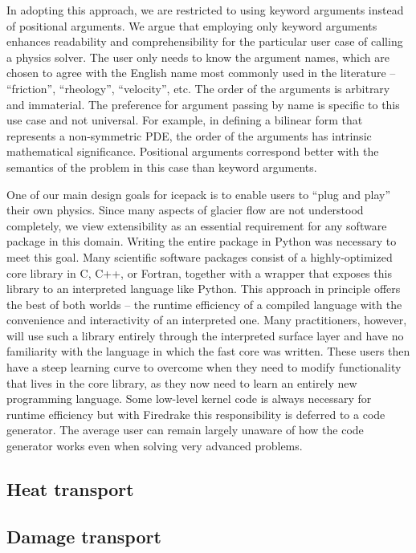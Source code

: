 \documentclass{article}
\theoremstyle{definition}
\theoremstyle{plain}
\begin{document}
In adopting this approach, we are restricted to using keyword arguments instead of positional arguments.
We argue that employing only keyword arguments enhances readability and comprehensibility for the particular user case of calling a physics solver.
The user only needs to know the argument names, which are chosen to agree with the English name most commonly used in the literature -- ``friction'', ``rheology'', ``velocity'', etc.
The order of the arguments is arbitrary and immaterial.
The preference for argument passing by name is specific to this use case and not universal.
For example, in defining a bilinear form that represents a non-symmetric PDE, the order of the arguments has intrinsic mathematical significance.
Positional arguments correspond better with the semantics of the problem in this case than keyword arguments.

One of our main design goals for icepack is to enable users to ``plug and play'' their own physics.
Since many aspects of glacier flow are not understood completely, we view extensibility as an essential requirement for any software package in this domain.
Writing the entire package in Python was necessary to meet this goal.
Many scientific software packages consist of a highly-optimized core library in C, C++, or Fortran, together with a wrapper that exposes this library to an interpreted language like Python.
This approach in principle offers the best of both worlds -- the runtime efficiency of a compiled language with the convenience and interactivity of an interpreted one.
Many practitioners, however, will use such a library entirely through the interpreted surface layer and have no familiarity with the language in which the fast core was written.
These users then have a steep learning curve to overcome when they need to modify functionality that lives in the core library, as they now need to learn an entirely new programming language.
Some low-level kernel code is always necessary for runtime efficiency but with Firedrake this responsibility is deferred to a code generator.
The average user can remain largely unaware of how the code generator works even when solving very advanced problems.

\subsection{Heat transport} \label{sec:heat-transport}

\subsection{Damage transport} \label{sec:damage-transport}
\end{document}

